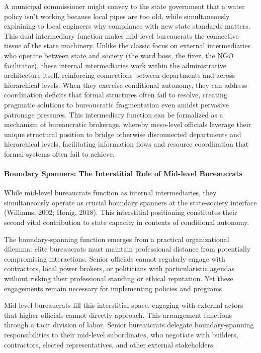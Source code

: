 A municipal commissioner might convey to the state government that a water policy isn't working because local pipes are too old, while simultaneously explaining to local engineers why compliance with new state standards matters. This dual intermediary function makes mid-level bureaucrats the connective tissue of the state machinery. Unlike the classic focus on external intermediaries who operate between state and society (the ward boss, the fixer, the NGO facilitator), these internal intermediaries work within the administrative architecture itself, reinforcing connections between departments and across hierarchical levels. When they exercise conditional autonomy, they can address coordination deficits that formal structures often fail to resolve, creating pragmatic solutions to bureaucratic fragmentation even amidst pervasive patronage pressures. This intermediary function can be formalized as a mechanism of bureaucratic brokerage, whereby meso-level officials leverage their unique structural position to bridge otherwise disconnected departments and hierarchical levels, facilitating information flows and resource coordination that formal systems often fail to achieve.


\paragraph{Boundary Spanners: The Interstitial Role of Mid-level Bureaucrats}

While mid-level bureaucrats function as internal intermediaries, they simultaneously operate as crucial boundary spanners at the state-society interface (Williams, 2002; Honig, 2018). This interstitial positioning constitutes their second vital contribution to state capacity in contexts of conditional autonomy.

The boundary-spanning function emerges from a practical organizational dilemma: elite bureaucrats must maintain professional distance from potentially compromising interactions. Senior officials cannot regularly engage with contractors, local power brokers, or politicians with particularistic agendas without risking their professional standing or ethical reputation. Yet these engagements remain necessary for implementing policies and programs.

Mid-level bureaucrats fill this interstitial space, engaging with external actors that higher officials cannot directly approach. This arrangement functions through a tacit division of labor. Senior bureaucrats delegate boundary-spanning responsibilities to their mid-level subordinates, who negotiate with builders, contractors, elected representatives, and other external stakeholders.

